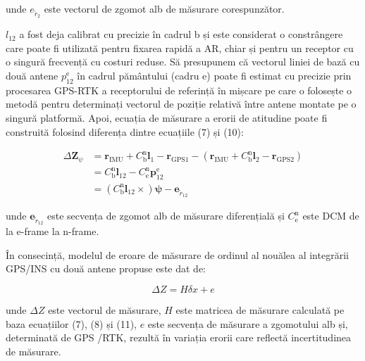 \documentclass[10pt]{report}
\begin{document}
unde $e_{\widetilde{r}_{2}}$ este vectorul de zgomot alb de măsurare corespunzător.

$l_{12}$ a fost deja calibrat cu precizie în cadrul b și este considerat o constrângere care poate fi utilizată pentru fixarea rapidă a AR, chiar și pentru un receptor cu o singură frecvență cu costuri reduse. Să presupunem că vectorul liniei de bază cu două antene $p_{12}^{\mathrm{e}}$ în cadrul pământului (cadru e) poate fi estimat cu precizie prin procesarea GPS-RTK a receptorului de referință în mișcare pe care o folosește o metodă pentru determinați vectorul de poziție relativă între antene montate pe o singură platformă. Apoi, ecuația de măsurare a erorii de atitudine poate fi construită folosind diferența dintre ecuațiile (7) și (10):

\begin{equation}
  \begin{aligned}
    \Delta \mathbf{Z}_{\psi} & =\boldsymbol{r}_{\mathrm{IMU}}+C_{\mathrm{b}}^{\mathrm{n}} \boldsymbol{l}_{1}-\boldsymbol{r}_{\mathrm{GPS} 1}-\left(\boldsymbol{r}_{\mathrm{IMU}}+C_{\mathrm{b}}^{\mathrm{n}} \boldsymbol{l}_{2}-\boldsymbol{r}_{\mathrm{GPS} 2}\right) \\
                             & =C_{\mathrm{b}}^{\mathrm{n}} \boldsymbol{l}_{12}-C_{\mathrm{e}}^{\mathrm{n}} \boldsymbol{p}_{12}^{\mathrm{e}}                                                                                                                           \\
                             & =\left(C_{\mathrm{b}}^{\mathrm{n}} \boldsymbol{l}_{12} \times\right) \boldsymbol{\psi}-\boldsymbol{e}_{\widetilde{r}_{12}}
  \end{aligned}
\end{equation}

unde $\boldsymbol{e}_{\widetilde{r}_{12}}$ este secvența de zgomot alb de măsurare diferențială și $C_{\mathrm{e}}^{\mathrm{n}}$ este DCM de la e-frame la n-frame.

În consecință, modelul de eroare de măsurare de ordinul al nouălea al integrării GPS/INS cu două antene propuse este dat de:

\begin{equation}
  \Delta Z=H \delta x+e
\end{equation}


unde $\Delta Z$ este vectorul de măsurare, $H$ este matricea de măsurare calculată pe baza ecuațiilor (7), (8) și (11), $e$ este secvența de măsurare a zgomotului alb și, determinată de GPS /RTK, rezultă în variația erorii care reflectă incertitudinea de măsurare.
\end{document}
